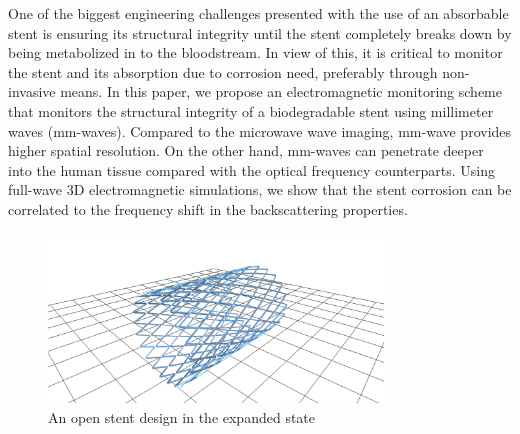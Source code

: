 \documentclass[conference,a4paper]{IEEEtran}
\begin{document}
One of the biggest engineering challenges presented with the use of an absorbable stent is ensuring its structural integrity until the stent completely breaks down by being metabolized in to the bloodstream. In view of this, it is critical to monitor the stent and its absorption due to corrosion need, preferably through non-invasive means. In this paper, we propose an electromagnetic monitoring scheme that monitors the structural integrity of a biodegradable stent using millimeter waves (mm-waves). Compared to the microwave wave imaging, mm-wave provides higher spatial resolution. On the other hand, mm-waves can penetrate deeper into the human tissue compared with the optical frequency counterparts. Using full-wave 3D electromagnetic simulations, we show that the stent corrosion can be correlated to the frequency shift in the backscattering properties.
%
\begin{figure}[b!]
  \centering
  \includegraphics[width=3.5in]{Stent.PNG}
  \caption{An open stent design in the expanded state}
  \label{fig:stent}
\end{figure}
%
\vspace{7pt}
\end{document}
